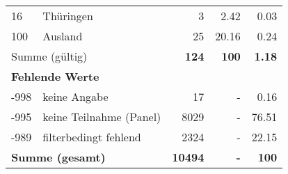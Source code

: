 \begin{longtable}{lXrrr}
     16 &
     \multicolumn{1}{X}{ Thüringen   } &


       \num{3} &
       \num[round-mode=places,round-precision=2]{2,42} &
         \num[round-mode=places,round-precision=2]{0,03} \\

     100 &
     \multicolumn{1}{X}{ Ausland   } &


       \num{25} &
       \num[round-mode=places,round-precision=2]{20,16} &
         \num[round-mode=places,round-precision=2]{0,24} \\
     \midrule
     \multicolumn{2}{l}{Summe (gültig)} &
       \textbf{\num{124}} &
     \textbf{100} &
       \textbf{\num[round-mode=places,round-precision=2]{1,18}} \\
     \multicolumn{5}{l}{\textbf{Fehlende Werte}}\\
       -998 &
       keine Angabe &
         \num{17} &
        - &
         \num[round-mode=places,round-precision=2]{0,16} \\
       -995 &
       keine Teilnahme (Panel) &
         \num{8029} &
        - &
         \num[round-mode=places,round-precision=2]{76,51} \\
       -989 &
       filterbedingt fehlend &
         \num{2324} &
        - &
         \num[round-mode=places,round-precision=2]{22,15} \\
     \midrule
     \multicolumn{2}{l}{\textbf{Summe (gesamt)}} &
          \textbf{\num{10494}} &
        \textbf{-} &
        \textbf{100} \\
     \bottomrule
     \end{longtable}
     
